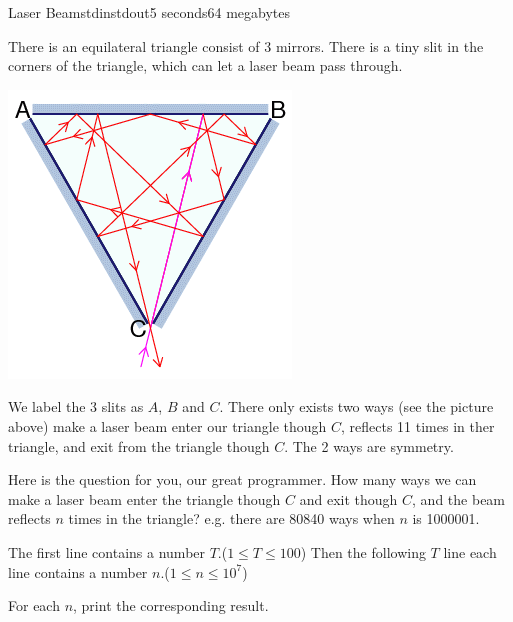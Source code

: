 \begin{problem}{Laser Beam}{stdin}{stdout}{5 seconds}{64 megabytes}

There is an equilateral triangle consist of 3 mirrors. There is a tiny slit in the corners of the triangle, which can let a laser beam pass through.

\begin{center}
\includegraphics{figure.png}
\end{center}


We label the 3 slits as $A$, $B$ and $C$. There only exists two ways (see the picture above) make a laser beam enter our triangle though $C$, reflects 11 times in ther triangle, and exit from the triangle though $C$. The 2 ways are symmetry.

Here is the question for you, our great programmer. How many ways we can make a laser beam enter the triangle though $C$ and exit though $C$, and the beam reflects $n$ times in the triangle? e.g. there are 80840 ways when $n$ is 1000001.


\InputFile
The first line contains a number $T$.($1\leq T\leq 100$)
Then the following $T$ line each line contains a number $n$.($1\leq n\leq 10^7$)

\OutputFile
For each $n$, print the corresponding result.

\Examples

\begin{example}
%
\end{example}

\end{problem}
